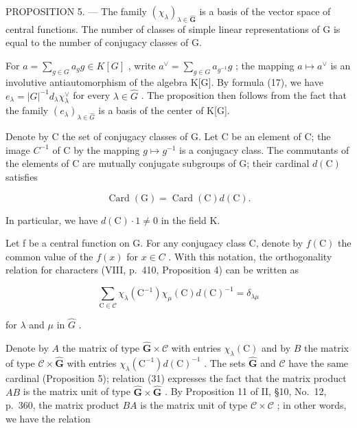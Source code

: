 PROPOSITION 5. --- The family \((\chi_{\lambda})_{\lambda\in\widehat{\mathbf{G}}}\) is a basis of the vector space of central functions. The number of classes of simple linear representations of G is equal to the number of conjugacy classes of G.

For \(a = \sum_{g \in G} a_g g \in K[G]\) , write \(a^\vee = \sum_{g \in G} a_{g^{-1}} g\) ; the mapping \(a \mapsto a^\vee\) is an involutive antiautomorphism of the algebra K{[}G{]}. By formula (17), we have \(e_\lambda = |G|^{-1} d_\lambda \chi_\lambda^\vee\) for every \(\lambda \in \widehat{G}\) . The proposition then follows from the fact that the family \((e_\lambda)_{\lambda \in \widehat{G}}\) is a basis of the center of K{[}G{]}.

Denote by C the set of conjugacy classes of G. Let C be an element of C; the image \(C^{-1}\) of C by the mapping \(g \mapsto g^{-1}\) is a conjugacy class. The commutants of the elements of C are mutually conjugate subgroups of G; their cardinal \(d(\mathrm{C})\) satisfies

\[
\operatorname{Card} (\mathrm{G}) = \operatorname{Card} (\mathrm{C}) d (\mathrm{C}).\tag{30}
\]

In particular, we have \(d(\mathrm{C}) \cdot 1 \neq 0\) in the field K.

Let f be a central function on G. For any conjugacy class C, denote by \(f(\mathrm{C})\) the common value of the \(f(x)\) for \(x \in C\) . With this notation, the orthogonality relation for characters (VIII, p.~410, Proposition 4) can be written as

\[
\sum_ {\mathrm{C} \in \mathcal {C}} \chi_ {\lambda} (\mathrm{C} ^ {- 1}) \chi_ {\mu} (\mathrm{C}) d (\mathrm{C}) ^ {- 1} = \delta_ {\lambda \mu}\tag{31}
\]

for \(\lambda\) and \(\mu\) in \(\widehat{G}\) .

Denote by \(A\) the matrix of type \(\widehat{\mathbf{G}} \times \mathcal{C}\) with entries \(\chi_{\lambda}(\mathrm{C})\) and by \(B\) the matrix of type \(\mathcal{C} \times \widehat{\mathbf{G}}\) with entries \(\chi_{\lambda}(\mathrm{C}^{-1}) d(\mathrm{C})^{-1}\) . The sets \(\widehat{\mathbf{G}}\) and \(\mathcal{C}\) have the same cardinal (Proposition 5); relation (31) expresses the fact that the matrix product \(AB\) is the matrix unit of type \(\widehat{\mathbf{G}} \times \widehat{\mathbf{G}}\) . By Proposition 11 of II, §10, No.~12, p.~360, the matrix product \(BA\) is the matrix unit of type \(\mathcal{C} \times \mathcal{C}\) ; in other words, we have the relation

